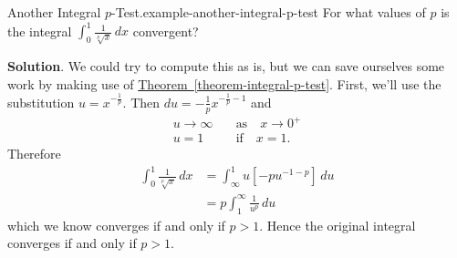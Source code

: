 \documentclass[10pt,]{book}
\numberwithin{equation}{section}
\newcommand{\gt}{>}
\begin{document}
\begin{example}{Another Integral \(p\)-Test.}{example-another-integral-p-test}%
\hypertarget{p-600}{}%
For what values of \(p\) is the integral \(\int_{0}^{1}\frac{1}{\sqrt[p]{x}}\,dx\) convergent?%
\par\smallskip%
\noindent\textbf{Solution}.\hypertarget{solution-130}{}\quad%
\hypertarget{p-601}{}%
We could try to compute this as is, but we can save ourselves some work by making use of \hyperref[theorem-integral-p-test]{Theorem~\ref{theorem-integral-p-test}}. First, we'll use the substitution \(u = x^{-\frac{1}{p}}\). Then \(du = -\frac{1}{p}x^{-\frac{1}{p} - 1}\) and%
\begin{align*}
u\to\infty & \quad\text{as}\quad x\to0^{+}\\
u = 1 & \quad\text{if}\quad x = 1.
\end{align*}
Therefore%
\begin{align*}
\int_{0}^{1}\frac{1}{\sqrt[p]{x}}\,dx &= \int_{\infty}^{1}u\left[-pu^{-1 - p}\right]\,du\\
& = p\int_{1}^{\infty}\frac{1}{u^{p}}\,du
\end{align*}
which we know converges if and only if \(p \gt 1\). Hence the original integral converges if and only if \(p\gt1\).%
\end{example}
%
%
\typeout{************************************************}
\typeout{************************************************}
%
\end{document}
